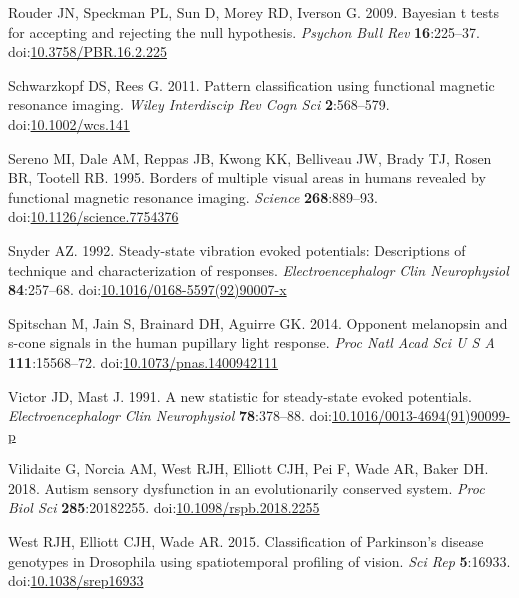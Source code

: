 \documentclass[]{article}
\begin{document}
\leavevmode\hypertarget{ref-Rouder2009}{}%
Rouder JN, Speckman PL, Sun D, Morey RD, Iverson G. 2009. Bayesian t tests for accepting and rejecting the null hypothesis. \emph{Psychon Bull Rev} \textbf{16}:225--37. doi:\href{https://doi.org/10.3758/PBR.16.2.225}{10.3758/PBR.16.2.225}

\leavevmode\hypertarget{ref-Schwarzkopf2011}{}%
Schwarzkopf DS, Rees G. 2011. Pattern classification using functional magnetic resonance imaging. \emph{Wiley Interdiscip Rev Cogn Sci} \textbf{2}:568--579. doi:\href{https://doi.org/10.1002/wcs.141}{10.1002/wcs.141}

\leavevmode\hypertarget{ref-Sereno1995}{}%
Sereno MI, Dale AM, Reppas JB, Kwong KK, Belliveau JW, Brady TJ, Rosen BR, Tootell RB. 1995. Borders of multiple visual areas in humans revealed by functional magnetic resonance imaging. \emph{Science} \textbf{268}:889--93. doi:\href{https://doi.org/10.1126/science.7754376}{10.1126/science.7754376}

\leavevmode\hypertarget{ref-Snyder1992}{}%
Snyder AZ. 1992. Steady-state vibration evoked potentials: Descriptions of technique and characterization of responses. \emph{Electroencephalogr Clin Neurophysiol} \textbf{84}:257--68. doi:\href{https://doi.org/10.1016/0168-5597(92)90007-x}{10.1016/0168-5597(92)90007-x}

\leavevmode\hypertarget{ref-Spitschan2014}{}%
Spitschan M, Jain S, Brainard DH, Aguirre GK. 2014. Opponent melanopsin and s-cone signals in the human pupillary light response. \emph{Proc Natl Acad Sci U S A} \textbf{111}:15568--72. doi:\href{https://doi.org/10.1073/pnas.1400942111}{10.1073/pnas.1400942111}

\leavevmode\hypertarget{ref-Victor1991}{}%
Victor JD, Mast J. 1991. A new statistic for steady-state evoked potentials. \emph{Electroencephalogr Clin Neurophysiol} \textbf{78}:378--88. doi:\href{https://doi.org/10.1016/0013-4694(91)90099-p}{10.1016/0013-4694(91)90099-p}

\leavevmode\hypertarget{ref-Vilidaite2018}{}%
Vilidaite G, Norcia AM, West RJH, Elliott CJH, Pei F, Wade AR, Baker DH. 2018. Autism sensory dysfunction in an evolutionarily conserved system. \emph{Proc Biol Sci} \textbf{285}:20182255. doi:\href{https://doi.org/10.1098/rspb.2018.2255}{10.1098/rspb.2018.2255}

\leavevmode\hypertarget{ref-West2015}{}%
West RJH, Elliott CJH, Wade AR. 2015. Classification of Parkinson's disease genotypes in Drosophila using spatiotemporal profiling of vision. \emph{Sci Rep} \textbf{5}:16933. doi:\href{https://doi.org/10.1038/srep16933}{10.1038/srep16933}
\end{document}

